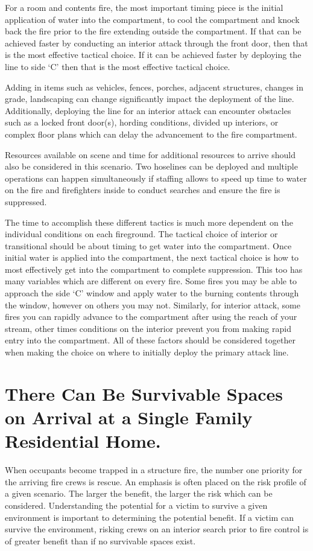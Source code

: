 \documentclass[12pt,oneside]{book}
\begin{document}
For a room and contents fire, the most important timing piece is the initial application of water into the compartment, to cool the compartment and knock back the fire prior to the fire extending outside the compartment. If that can be achieved faster by conducting an interior attack through the front door, then that is the most effective tactical choice. If it can be achieved faster by deploying the line to side `C' then that is the most effective tactical choice.

Adding in items such as vehicles, fences, porches, adjacent structures, changes in grade, landscaping can change significantly impact the deployment of the line. Additionally, deploying the line for an interior attack can encounter obstacles such as a locked front door(s), hording conditions, divided up interiors, or complex floor plans which can delay the advancement to the fire compartment. 

Resources available on scene and time for additional resources to arrive should also be considered in this scenario. Two hoselines can be deployed and multiple operations can happen simultaneously if staffing allows to speed up time to water on the fire and firefighters inside to conduct searches and ensure the fire is suppressed.

The time to accomplish these different tactics is much more dependent on the individual conditions on each fireground. The tactical choice of interior or transitional should be about timing to get water into the compartment. Once initial water is applied into the compartment, the next tactical choice is how to most effectively get into the compartment to complete suppression. This too has many variables which are different on every fire. Some fires you may be able to approach the side `C' window and apply water to the burning contents through the window, however on others you may not. Similarly, for interior attack, some fires you can rapidly advance to the compartment after using the reach of your stream, other times conditions on the interior prevent you from making rapid entry into the compartment. All of these factors should be considered together when making the choice on where to initially deploy the primary attack line. 

\section{There Can Be Survivable Spaces on Arrival at a Single Family Residential Home.} \label{tc:survivable_spaces}
When occupants become trapped in a structure fire, the number one priority for the arriving fire crews is rescue. An emphasis is often placed on the risk profile of a given scenario. The larger the benefit, the larger the risk which can be considered. Understanding the potential for a victim to survive a given environment is important to determining the potential benefit. If a victim can survive the environment, risking crews on an interior search prior to fire control is of greater benefit than if no survivable spaces exist. 
\end{document}
